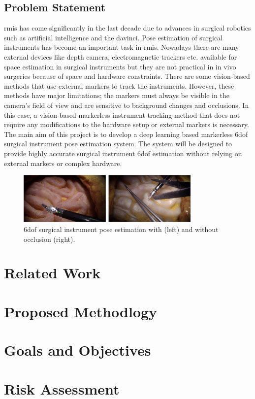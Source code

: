 \documentclass[12pt]{article}
\begin{document}
\subsection{Problem Statement}
\gls{rmis} has come significantly in the last decade due to advances in surgical robotics such as artificial intelligence and the \gls{davinci}. Pose estimation of surgical instruments has become an important task in \gls{rmis}. 
Nowadays there are many external devices like depth camera, electromagnetic trackers etc. available for space estimation in surgical instruments but they are not practical in in vivo surgeries because of space and hardware constraints\cite{enhancedmarker}. There are some vision-based methods that use external markers to track the instruments. However, these methods have major limitations; the markers must always be visible in the camera's field of view and are sensitive to background changes and occlusions\cite{10160287}. In this case, a vision-based markerless instrument tracking method that does not require any modifications to the hardware setup or external markers is necessary. The main aim of this project is to develop a deep learning based markerless \gls{6dof} surgical instrument pose estimation system. The system will be designed to provide highly accurate surgical instrument \gls{6dof} estimation without relying on external markers or complex hardware.

\begin{figure}[H]
            \centering
            \includegraphics[width=0.8\textwidth]{6Dof.png}
            \caption{\gls{6dof} surgical instrument pose estimation with (left) and without occlusion (right). \cite{surgripe2024}}
      \end{figure}


\section{Related Work}


\section{Proposed Methodlogy}


\section{Goals and Objectives}


\section{Risk Assessment}

\printbibliography
\printglossaries
\label{sec:glossary}
\end{document}

